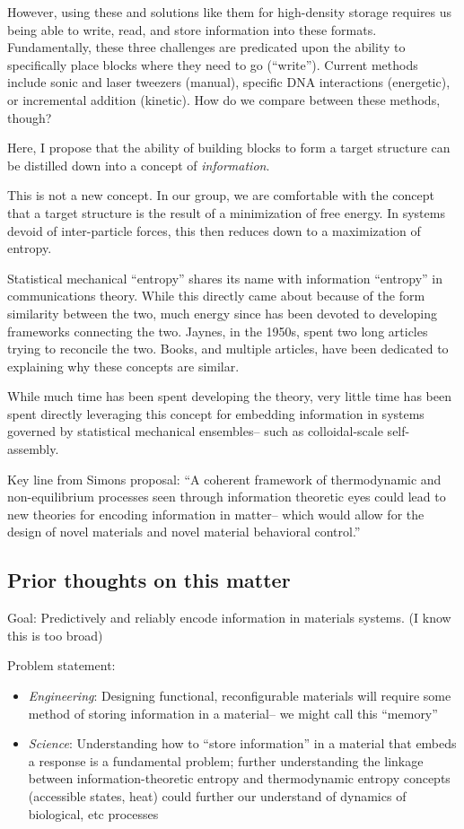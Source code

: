 However, using these and solutions like them for high-density storage requires us being able to write, read, and store information into these formats.
Fundamentally, these three challenges are predicated upon the ability to specifically place blocks where they need to go (``write'').
Current methods include sonic and laser tweezers (manual), specific DNA interactions (energetic), or incremental addition (kinetic).
How do we compare between these methods, though?

Here, I propose that the ability of building blocks to form a target structure can be distilled down into a concept of \textit{information}.

This is not a new concept.
In our group, we are comfortable with the concept that a target structure is the result of a minimization of free energy.
In systems devoid of inter-particle forces, this then reduces down to a maximization of entropy.

Statistical mechanical ``entropy'' shares its name with information ``entropy'' in communications theory.
While this directly came about because of the form similarity between the two, much energy since has been devoted to developing frameworks connecting the two.
Jaynes, in the 1950s, spent two long articles trying to reconcile the two. 
Books, and multiple articles, have been dedicated to explaining why these concepts are similar.

While much time has been spent developing the theory, very little time has been spent directly leveraging this concept for embedding information in systems governed by statistical mechanical ensembles-- such as colloidal-scale self-assembly.

Key line from Simons proposal: ``A coherent framework of thermodynamic and non-equilibrium processes seen through information theoretic eyes could lead to new theories for encoding information in matter-- which would allow for the design of novel materials and novel material behavioral control.''


\subsection{Prior thoughts on this matter}

Goal: Predictively and reliably encode information in materials systems. (I know this is too broad)

Problem statement:
\begin{itemize}
\item \textit{Engineering}: Designing functional, reconfigurable materials will require some method of storing information in a material-- we might call this ``memory''
\item \textit{Science}: Understanding how to ``store information'' in a material that embeds a response is a fundamental problem; further understanding the linkage between information-theoretic entropy and thermodynamic entropy concepts (accessible states, heat) could further our understand of dynamics of biological, etc processes
\end{itemize}



